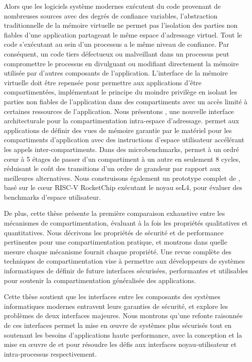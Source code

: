 Alors que les logiciels système modernes exécutent du code provenant de nombreuses sources avec des degrés de confiance variables, l'abstraction traditionnelle de la mémoire virtuelle ne permet pas l'isolation des parties non fiables d'une application partageant le même espace d'adressage virtuel. 
Tout le code s'exécutant au sein d'un processus a le même niveau de confiance. 
Par conséquent, un code tiers défectueux ou malveillant dans un processus peut compromettre le processus en divulguant ou modifiant directement la mémoire utilisée par d'autres composants de l'application. 
L'interface de la mémoire virtuelle doit être repensée pour permettre aux applications d'être compartimentées, implémentant le principe du moindre privilège en isolant les parties non fiables de l'application dans des compartiments avec un accès limité à certaines ressources de l'application. 
Nous présentons \seccells, une nouvelle interface architecturale pour la compartimentation intra-espace d'adressage. \seccells permet aux applications de définir des vues de mémoire garantie par le matériel pour les compartiments d'application avec des instructions d'espace utilisateur accélérant les appels inter-compartiments. 
Dans des microbenchmarks, \seccells permet à un ordré cœur à 5 étages de passer d'un compartiment à un autre en seulement 8 cycles, réduisant le coût des transitions d'un ordre de grandeur par rapport aux meilleures alternatives. 
Nous construisons également un prototype complet de \seccells, basé sur le cœur RISC-V RocketChip exécutant le noyau seL4, pour évaluer des benchmarks d'espace utilisateur.

De plus, cette thèse présente la première comparaison exhaustive entre les mécanismes de compartimentation, évaluant à la fois les propriétés qualitatives et quantitatives. 
Nous décrivons les propriétés de sécurité et de performance pertinentes pour une compartimentation pratique, et montrons dans quelle mesure chaque mécanisme fournit chaque propriété. 
Une revue complète des techniques de compartimentation vise à permettre aux développeurs de systèmes informatiques de définir de future interfaces sécurisées, performantes et utilisables pour soutenir la compartimentation généralisée des applications.

Cette thèse soutient que les interfaces entre les composants des systèmes informatiques modernes entravent leurs garanties de sécurité, et explore les problèmes de deux interfaces majeures. 
Nous montrons qu'une refonte raisonnée de ces interfaces permet la mise en œuvre de systèmes plus sécurisés tout en soutenant les besoins d'applications haute performance, avec la conception et la mise en œuvre de \midas et \seccells pour résoudre les défis aux interfaces noyau-utilisateur et intra-processus respectivement.